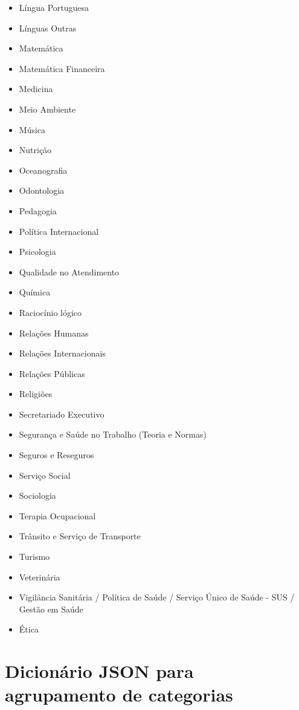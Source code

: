 \begin{multicols}{2}
\begin{itemize}
        \item Língua Portuguesa
        \item Línguas Outras
        \item Matemática
        \item Matemática Financeira
        \item Medicina
        \item Meio Ambiente
        \item Música
        \item Nutrição
        \item Oceanografia
        \item Odontologia
        \item Pedagogia
        \item Política Internacional
        \item Psicologia
        \item Qualidade no Atendimento
        \item Química
        \item Raciocínio lógico
        \item Relações Humanas
        \item Relações Internacionais
        \item Relações Públicas
        \item Religiões
        \item Secretariado Executivo
        \item Segurança e Saúde no Trabalho (Teoria e Normas)
        \item Seguros e Reseguros
        \item Serviço Social
        \item Sociologia
        \item Terapia Ocupacional
        \item Trânsito e Serviço de Transporte
       	\item Turismo
        \item Veterinária
        \item Vigilância Sanitária / Política de Saúde / Serviço Único de Saúde - SUS / Gestão em Saúde
        \item Ética
    \end{itemize}
    \end{multicols}



\chapter{Dicionário JSON para agrupamento de categorias}
\label{JSON_dict}
\noindent


